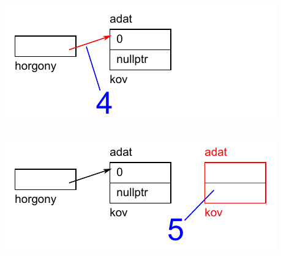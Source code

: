 \begin{frame}
  \begin{columns}[c]
      \begin{exampleblock}{}
        
      \end{exampleblock}
      \includegraphics[width=\textwidth]{verem/verem05.pdf}
  \end{columns}
\end{frame}

\begin{frame}
  \begin{columns}[c]
      \begin{exampleblock}{}
        
      \end{exampleblock}
      \includegraphics[width=\textwidth]{verem/verem06.pdf}
  \end{columns}
\end{frame}

